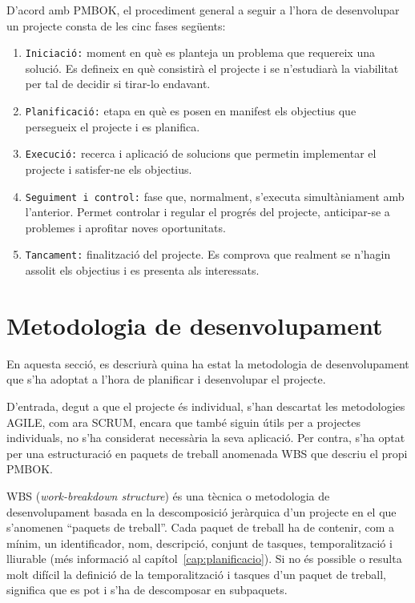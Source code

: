 \documentclass[a4paper,12pt]{ThesisStyle}
\begin{document}
D'acord amb PMBOK, el procediment general a seguir a l'hora de desenvolupar un projecte consta de les cinc fases següents:
\begin{enumerate}
  \item \texttt{Iniciació:} moment en què es planteja un problema que requereix una solució. Es defineix en què consistirà el projecte i se n'estudiarà la viabilitat per tal de decidir si tirar-lo endavant.
  \item \texttt{Planificació:} etapa en què es posen en manifest els objectius que persegueix el projecte i es planifica.
  \item \texttt{Execució:} recerca i aplicació de solucions que permetin implementar el projecte i satisfer-ne els objectius.
  \item \texttt{Seguiment i control:} fase que, normalment, s'executa simultàniament amb l'anterior. Permet controlar i regular el progrés del projecte, anticipar-se a problemes i aprofitar noves oportunitats.
  \item \texttt{Tancament:} finalització del projecte. Es comprova que realment se n'hagin assolit els objectius i es presenta als interessats.
\end{enumerate}

\section{Metodologia de desenvolupament}
\label{sec:metodologia_desenvolupament}

En aquesta secció, es descriurà quina ha estat la metodologia de desenvolupament que s'ha adoptat a l'hora de planificar i desenvolupar el projecte.

D'entrada, degut a que el projecte és individual, s'han descartat les metodologies AGILE, com ara SCRUM, encara que també siguin útils per a projectes individuals, no s'ha considerat necessària la seva aplicació. Per contra, s'ha optat per una estructuració en paquets de treball anomenada WBS que descriu el propi PMBOK.

WBS (\textit{work-breakdown structure}) és una tècnica o metodologia de desenvolupament basada en la descomposició jeràrquica d'un projecte en el que s'anomenen ``paquets de treball''. Cada paquet de treball ha de contenir, com a mínim, un identificador, nom, descripció, conjunt de tasques, temporalització i lliurable (més informació al capítol~\ref{cap:planificacio}). Si no és possible o resulta molt difícil la definició de la temporalització i tasques d'un paquet de treball, significa que es pot i s'ha de descomposar en subpaquets.
\end{document}
